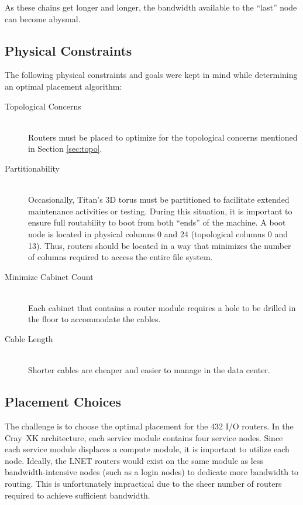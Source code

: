 As these chains get longer and longer, the bandwidth available to the ``last''
node can become abysmal.

\subsection{Physical Constraints}


The following physical constraints and goals were kept in mind while
determining an optimal placement algorithm:

\begin{description}
  \item[Topological Concerns] \hfill \\
    Routers must be placed to optimize for the topological concerns mentioned
    in Section \ref{sec:topo}.
  \item[Partitionability] \hfill \\
    Occasionally, Titan's 3D torus must be partitioned to facilitate extended
    maintenance activities or testing.  During this situation, it is important to
    ensure full routability to boot from both ``ends'' of the machine.  A boot
    node is located in physical columns 0 and 24 (topological columns 0 and 13).
    Thus, routers should be located in a way that minimizes the number of
    columns required to access the entire file system.
  \item[Minimize Cabinet Count] \hfill \\
    Each cabinet that contains a router module requires a hole to be drilled in
    the floor to accommodate the cables.
  \item[Cable Length] \hfill \\
    Shorter cables are cheaper and easier to manage in the data center.
\end{description}

\subsection{Placement Choices}

The challenge is to choose the optimal placement for the 432 I/O routers. In
the Cray~XK architecture, each service module contains four service nodes.
Since each service module displaces a compute module, it is important to
utilize each node.  Ideally, the LNET routers would exist on the same module as
less bandwidth-intensive nodes (such as a login nodes) to dedicate more
bandwidth to routing.  This is unfortunately impractical due to the sheer number
of routers required to achieve sufficient bandwidth.

